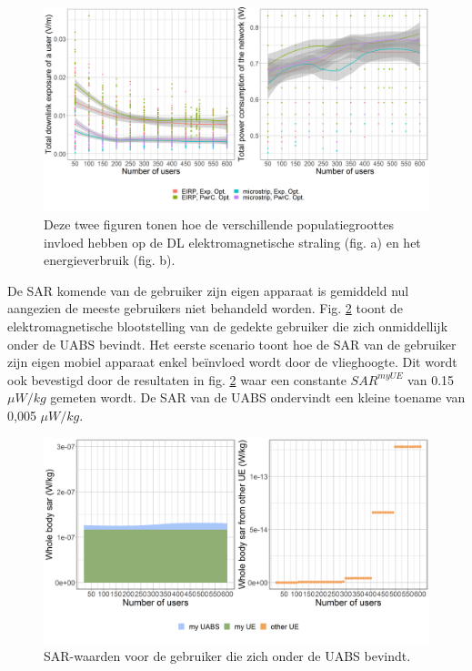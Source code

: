 \documentclass[twocolumn]{phdsymp_dutch}
\begin{document}
\begin{figure}[h!]
  \includegraphics[width=\linewidth]{../results/s2/uvsdlAndPc.png}
  \caption{Deze twee figuren tonen hoe de verschillende populatiegroottes invloed hebben op de \acs{DL} elektromagnetische straling (fig. a) en het energieverbruik (fig. b).}
  \label{fig:s2b_dlAndPc}
\end{figure}

De \gls{SAR} komende van de gebruiker zijn eigen apparaat is gemiddeld nul aangezien de meeste gebruikers niet behandeld worden.
Fig. \ref{fig:uvsulsarcentralUsers} toont de elektromagnetische blootstelling van de gedekte gebruiker die zich onmiddellijk onder de \gls{UABS} bevindt.
Het eerste scenario toont hoe de \gls{SAR} van de gebruiker zijn eigen mobiel apparaat enkel be\"invloed wordt door de vlieghoogte.
Dit wordt ook bevestigd door de resultaten in fig. \ref{fig:uvsulsarcentralUsers} waar een constante 
$SAR^{myUE}$ van 0.15 $\mu W/kg$ gemeten wordt.
De \gls{SAR} van de  \gls{UABS} ondervindt een kleine toename van 0,005  $\mu W/kg$.
\begin{figure}[h]
\centering
  \includegraphics[width=0.9\linewidth]{../results/s2/uvsulsarcentralUser.png}
  \caption{SAR-waarden voor de gebruiker die zich onder de \acs{UABS} bevindt.}
  \label{fig:uvsulsarcentralUsers}
\end{figure}
\end{document}
